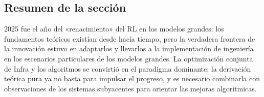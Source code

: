 \subsection{Resumen de la sección}

2025 fue el año del «renacimiento» del RL en los modelos grandes: los fundamentos teóricos existían desde hacía tiempo, pero la verdadera frontera de la innovación estuvo en adaptarlos y llevarlos a la implementación de ingeniería en los escenarios particulares de los modelos grandes. La optimización conjunta de Infra y los algoritmos se convirtió en el paradigma dominante; la derivación teórica pura ya no basta para impulsar el progreso, y es necesario combinarla con observaciones de los sistemas subyacentes para orientar las mejoras algorítmicas.

